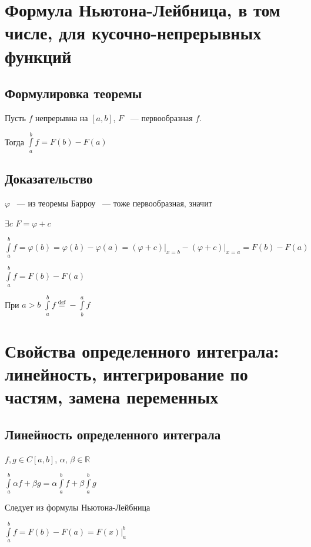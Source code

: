 \documentclass{article}
\begin{document}
	\newpage
	
	\section{Формула Ньютона-Лейбница, в том числе, для кусочно-непрерывных функций}
	
		\subsection{Формулировка теоремы}
		
			Пусть $f$ непрерывна на $[a, b]$, $F$ ~--- первообразная $f$. 
		
			Тогда $\int\limits^b_a f = F(b) - F(a)$
		
		\subsection{Доказательство}
		
			$\varphi$ ~--- из теоремы Барроу ~--- тоже первообразная, значит
			
			$\exists c$ $F = \varphi + c$
			
			$\int\limits^b_a f = \varphi(b) = \varphi(b) - \varphi(a) = (\varphi + c) \bigg|_{x = b} - (\varphi + c) \bigg|_{x = a} = F(b) - F(a)$
			
			$\int\limits^b_a f = F(b) - F(a)$
			
			При $a > b$ $\int\limits^b_a f \stackrel{\mathrm{def}}{=} - \int\limits^a_b f$
			
	\newpage
	
	\section{Свойства определенного интеграла: линейность, интегрирование по частям, замена переменных}
	
		\subsection{Линейность определенного интеграла}
		
			$f, g \in C[a, b]$, $\alpha$, $\beta \in \mathbb{R}$
			
			$\int\limits^b_a \alpha f + \beta g = \alpha \int\limits^b_a f + \beta \int\limits^b_a g$
			
			Следует из формулы Ньютона-Лейбница
			
			$\int\limits^b_a f = F(b) - F(a) = F(x) \bigg|^b_a$
			
\end{document}
